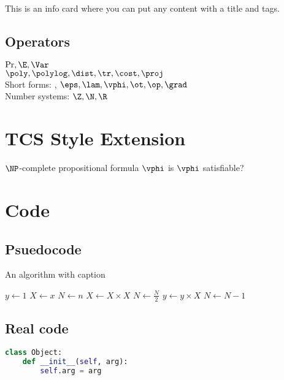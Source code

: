 {This is an info card where you can put any content with a title and tags.}

\subsection{Operators}
$\Pr, \E, \Var$ \\
$\poly, \polylog, \dist, \tr, \cost, \proj$ \\
Short forms: \TT, \FF $\eps, \lam, \vphi, \ot, \op, \grad$ \\
Number systems: $\Z, \N, \R$

\section{TCS Style Extension}
{$\NP$-complete}
{propositional formula $\vphi$}
{is $\vphi$ satisfiable?}

\label{mylastpagelabel}

\section{Code}
\subsection{Psuedocode}
\begin{algorithm}
\caption{An algorithm with caption}\label{alg:cap}
\begin{algorithmic}[1]
\State $y \gets 1$
\State $X \gets x$
\State $N \gets n$
        \State $X \gets X \times X$
        \State $N \gets \frac{N}{2}$  
        \State $y \gets y \times X$
        \State $N \gets N - 1$
    \EndIf
\EndWhile
\end{algorithmic}
\end{algorithm}

\subsection{Real code}
\begin{lstlisting}[language=Python]
class Object:
    def __init__(self, arg):
        self.arg = arg
\end{lstlisting}
